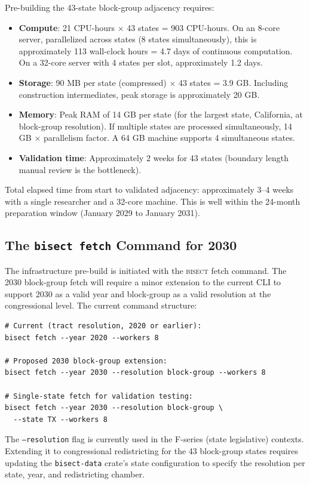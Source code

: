 Pre-building the 43-state block-group adjacency requires:

\begin{itemize}
\item \textbf{Compute}: 21 CPU-hours $\times$ 43 states = 903 CPU-hours. On an
  8-core server, parallelized across states (8 states simultaneously), this is
  approximately 113 wall-clock hours = 4.7 days of continuous computation.
  On a 32-core server with 4 states per slot, approximately 1.2 days.

\item \textbf{Storage}: 90 MB per state (compressed) $\times$ 43 states = 3.9 GB.
  Including construction intermediates, peak storage is approximately 20 GB.

\item \textbf{Memory}: Peak RAM of 14 GB per state (for the largest state, California,
  at block-group resolution). If multiple states are processed simultaneously, 14 GB
  $\times$ parallelism factor. A 64 GB machine supports 4 simultaneous states.

\item \textbf{Validation time}: Approximately 2 weeks for 43 states (boundary length
  manual review is the bottleneck).
\end{itemize}

Total elapsed time from start to validated adjacency: approximately 3--4 weeks
with a single researcher and a 32-core machine. This is well within the 24-month
preparation window (January 2029 to January 2031).

\subsection{The \texttt{bisect fetch} Command for 2030}

The infrastructure pre-build is initiated with the \textsc{bisect} fetch command.
The 2030 block-group fetch will require a minor extension to the current CLI to
support 2030 as a valid year and block-group as a valid resolution at the congressional
level. The current command structure:

\begin{verbatim}
# Current (tract resolution, 2020 or earlier):
bisect fetch --year 2020 --workers 8

# Proposed 2030 block-group extension:
bisect fetch --year 2030 --resolution block-group --workers 8

# Single-state fetch for validation testing:
bisect fetch --year 2030 --resolution block-group \
  --state TX --workers 8
\end{verbatim}

The \texttt{--resolution} flag is currently used in the F-series (state legislative)
contexts. Extending it to congressional redistricting for the 43 block-group states
requires updating the \texttt{bisect-data} crate's state configuration to specify
the resolution per state, year, and redistricting chamber.
